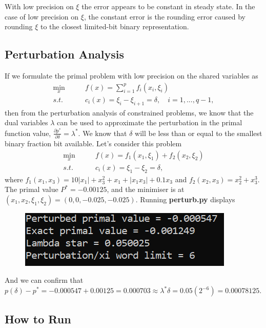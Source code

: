 \documentclass[12pt]{article}
\begin{document}
With low precision on $\xi$ the error appears to be constant in steady state. In the case of low precision on $\xi$, the constant error is the rounding error caused by rounding $\xi$ to the closest limited-bit binary representation.

\subsection*{Perturbation Analysis}

If we formulate the primal problem with low precision on the shared variables as
\begin{align*}
\min_x\qquad& f(x)=\sum\limits_{i=1}^{p}f_i(x_i,\xi_i)\\
s.t.\qquad&c_i(x)=\xi_i-\xi_{i+1}=\delta,\quad i=1,...,q-1,
\end{align*}
then from the perturbation analysis of constrained problems, we know that the dual variables $\lambda$ can be used to approximate the perturbation in the primal function value, $\frac{\partial p^*}{\partial \delta}=\lambda^*$. We know that $\delta$ will be less than or equal to the smallest binary fraction bit available. Let's consider this problem
\begin{align*}
\min_x\qquad& f(x)=f_1(x_1,\xi_1)+f_2(x_2,\xi_2)\\
s.t.\qquad&c_i(x)=\xi_1-\xi_2=\delta,
\end{align*}
where $f_1(x_1,x_3)=10|x_1|+x_3^2+x_1+|x_1x_3|+0.1x_3$ and $f_2(x_2,x_3)=x_2^2+x_3^3$. The primal value $P^*=-0.00125$, and the minimiser is at $(x_1,x_2,\xi_1,\xi_2)=(0,0,-0.025,-0.025)$. Running \textbf{perturb.py} displays

\begin{figure}[H]
	\centering
	\includegraphics[scale=1]{Problem4-Perturbed.png}
\end{figure}
And we can confirm that $p(\delta)-p^*=-0.000547+0.00125=0.000703\approx \lambda^* \delta=0.05(2^{-6})=0.00078125$.




\subsection*{How to Run}
\end{document}
